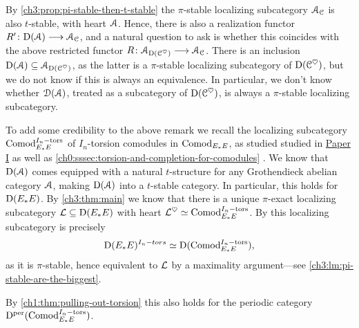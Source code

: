 \begin{remark}
    By \cref{ch3:prop:pi-stable-then-t-stable} the $\pi$-stable localizing subcategory $\EuScript{A}_{\EuScript{C}}$ is also $t$-stable, with heart $\EuScript{A}$. Hence, there is also a realization functor $R'\colon \mathrm{D}(\EuScript{A})\longrightarrow \EuScript{A}_{\EuScript{C}}$, and a natural question to ask is whether this coincides with the above restricted functor $R\colon \EuScript{A}_{\mathrm{D}(\EuScript{C}^\heartsuit)}\longrightarrow \EuScript{A}_{\EuScript{C}}$. There is an inclusion $\mathrm{D}(\EuScript{A})\subseteq \EuScript{A}_{\mathrm{D}(\EuScript{C}^\heartsuit)}$, as the latter is a $\pi$-stable localizing subcategory of $\mathrm{D}(\EuScript{C}^\heartsuit)$, but we do not know if this is always an equivalence. In particular, we don't know whether $\EuScript{D}(\EuScript{A})$, treated as a subcategory of $\mathrm{D}(\EuScript{C}^\heartsuit)$, is always a $\pi$-stable localizing subcategory. 
\end{remark}

\begin{addendum}
    To add some credibility to the above remark we recall 
    the localizing subcategory $\mathrm{Comod}_{E_*E}^{I_n-\mathrm{tors}}$ of $I_n$-torsion comodules in $\mathrm{Comod}_{E_*E}$, as studied studied in \hyperref[ch1]{Paper I} as well as \cref{ch0:sssec:torsion-and-completion-for-comodules} . We know that $\mathrm{D}(\EuScript{A})$ comes equipped with a natural $t$-structure for any Grothendieck abelian category $\EuScript{A}$, making $\mathrm{D}(\EuScript{A})$ into a $t$-stable category. In particular, this holds for $\mathrm{D}(E_*E)$. By \cref{ch3:thm:main} we know that there is a unique $\pi$-exact localizing subcategory $\mathcal{L} \subseteq \mathrm{D}(E_*E)$ with heart $\mathcal{L}^\heartsuit \simeq \mathrm{Comod}_{E_*E}^{I_n-\mathrm{tors}}$. By \cite[3.7(2)]{barthel-heard-valenzuela_2020} this localizing subcategory is precisely 
    \[\mathrm{D}(E_*E)^{I_n-tors} \simeq \mathrm{D}(\mathrm{Comod}_{E_*E}^{I_n-\mathrm{tors}}),\]
    as it is $\pi$-stable, hence equivalent to $\mathcal{L}$ by a maximality argument---see \cref{ch3:lm:pi-stable-are-the-biggest}. 

    By \cref{ch1:thm:pulling-out-torsion} this also holds for the periodic category $\mathrm{D}^{\mathrm{per}}(\mathrm{Comod}_{E_*E}^{I_n-\mathrm{tors}})$. 
\end{addendum}













